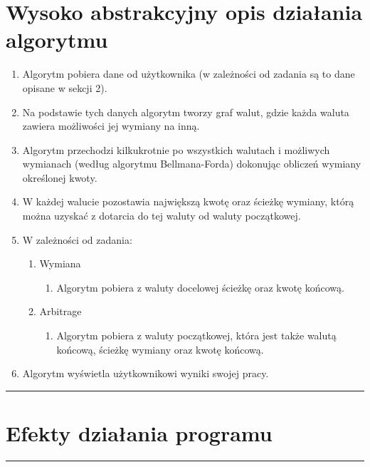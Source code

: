 \documentclass[a4paper,11pt]{article}
\newcommand{\linia}{\rule{\linewidth}{0.4mm}}
\begin{document}
\section{Wysoko abstrakcyjny opis działania algorytmu}
\begin{enumerate}
\item Algorytm pobiera dane od użytkownika (w zależności od zadania są to dane opisane w sekcji 2).
\item Na podstawie tych danych algorytm tworzy graf walut, gdzie każda waluta zawiera możliwości jej wymiany na inną.
\item Algorytm przechodzi kilkukrotnie po wszystkich walutach i możliwych wymianach (według algorytmu Bellmana-Forda) dokonując obliczeń wymiany określonej kwoty.
\item W każdej walucie pozostawia największą kwotę oraz ścieżkę wymiany, którą można uzyskać z dotarcia do tej waluty od waluty początkowej.
\item W zależności od zadania:
\begin{enumerate}
\item Wymiana
\begin{enumerate}
\item Algorytm pobiera z waluty docelowej ścieżkę oraz kwotę końcową.
\end{enumerate}
\item Arbitrage
\begin{enumerate}
\item Algorytm pobiera z waluty początkowej, która jest także walutą końcową, ścieżkę wymiany oraz kwotę końcową.
\end{enumerate}
\end{enumerate}
\item Algorytm wyświetla użytkownikowi wyniki swojej pracy.
\end{enumerate}
\noindent\linia
\section{ Efekty działania programu}
\noindent\linia
\end{document}

